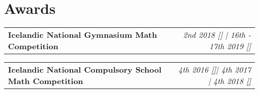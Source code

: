 \documentclass{article}
\makeatletter
\newcommand{\resumeProject}[2]{
\vspace{3mm}
    \begin{tabular*}{0.99\textwidth}[t]{l@{\extracolsep{\fill}}r}
        \textbf{#1} & \textit{\normalsize{#2}}
    \end{tabular*}
    \vspace{-2.5mm}
}
\newcommand{\resumeAward}[2]{
\vspace{3mm}
    \begin{tabular*}{0.99\textwidth}[t]{l@{\extracolsep{\fill}}r}
        \textbf{#1} & \textit{\normalsize{#2}} \\
    \end{tabular*}
    \vspace{-2mm}
}
\newcommand{\resumeSubHeadingListStart}{}
\newcommand{\resumeSubHeadingListEnd}{}
\makeatother
\begin{document}
\section{\textbf{Awards}}
\resumeSubHeadingListStart




\resumeAward
  {Icelandic National Gymnasium Math Competition}
  {2nd 2018 {}[\href{https://www.stae.is/stak/keppnin2018}{\textcolor{black}{\faIcon{globe}}}] | \textit{16th - 17th 2019 {}[\href{https://www.stae.is/stak/keppnin2019}{\textcolor{black}{\faIcon{globe}}}]}}

\resumeAward
	{Icelandic National Compulsory School Math Competition}
	{\textit{4th 2016 \href{http://www.lagafellsskoli.is/forsida/frettir/frett/2016/03/17/Staerdfraedikeppni-grunnskolanna-a-elsta-stigi/}{[\faGlobe]}}| \textit{4th 2017} | \textit{4th 2018 \href{http://www.lagafellsskoli.is/forsida/frettir/frett/2018/04/10/Urslit-staerdfraedikeppni-grunnskolanna-2018/}{[\faGlobe]}}}


\resumeSubHeadingListEnd

%
%
%
\end{document}
